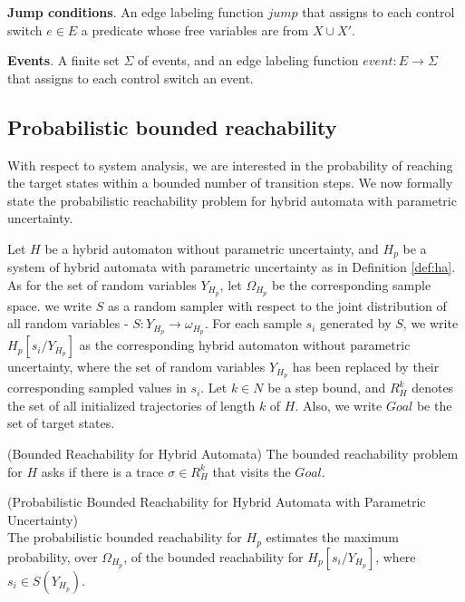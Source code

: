 {\begin{definition}
{\bf Jump conditions}. An edge labeling function $jump$ that assigns to each control switch $e \in E$ a predicate whose free variables are from $X \cup X'$.

{\bf Events}. A finite set $\Sigma$ of events, and an edge labeling function $event: E \to \Sigma$ that assigns to each control switch an event. 
 
\end{definition}

\subsection{Probabilistic bounded reachability}
With respect to system analysis, we are interested in the probability of reaching the target states within a bounded number of transition steps. We now formally state the probabilistic reachability problem for hybrid automata with parametric uncertainty. 

Let $H$ be a hybrid automaton without parametric uncertainty, and $H_p$ be a system of hybrid automata with parametric uncertainty as in Definition \ref{def:ha}. As for the set of random variables $Y_{H_p}$, let $\Omega_{H_p}$ be the corresponding sample space. we write $S$ as a random sampler with respect to the joint distribution of all random variables - $S: Y_{H_p} \to \omega_{H_p}$. For each sample $s_i$ generated by $S$, we write $H_{p}[s_i/Y_{H_p}]$ as the corresponding hybrid automaton without parametric uncertainty, where the set of random variables $Y_{H_p}$ has been replaced by their corresponding sampled values in $s_i$. Let $k \in N$ be a step bound, and $R_{H}^k$ denotes the set of all initialized trajectories of length $k$ of $H$. Also, we write $Goal$ be the set of target states.
\begin{remark}
\label{def:br}
{\rm (Bounded Reachability for Hybrid Automata)}
The bounded reachability problem for $H$ asks if there is a trace $\sigma \in R_{H}^k$ that visits the $Goal$.
\end{remark}
\begin{definition}
\label{def:pbr}
{\rm (Probabilistic Bounded Reachability for Hybrid Automata with Parametric Uncertainty)}\\
The probabilistic bounded reachability for $H_p$ estimates the maximum probability, over $\Omega_{H_p}$, of the bounded reachability for $H_{p}[s_i/Y_{H_p}]$, where $s_i \in S(Y_{H_p})$.
\end{definition}
}


